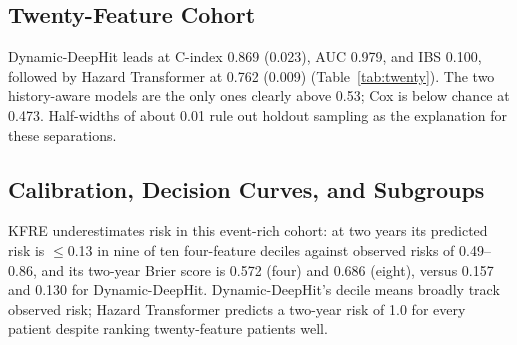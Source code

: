 \subsection{Twenty-Feature Cohort}
\begin{table}[t]
\centering
\scriptsize
\setlength{\tabcolsep}{1.5pt}
\caption{Twenty-feature holdout performance (6{,}521 patients per split). Columns as in Table~\ref{tab:discrimination}; no KFRE equation exists.}
\label{tab:twenty}
\end{table}

Dynamic-DeepHit leads at C-index 0.869 (0.023), AUC 0.979, and IBS 0.100, followed by Hazard Transformer at 0.762 (0.009) (Table~\ref{tab:twenty}). The two history-aware models are the only ones clearly above 0.53; Cox is below chance at 0.473. Half-widths of about 0.01 rule out holdout sampling as the explanation for these separations.

\subsection{Calibration, Decision Curves, and Subgroups}
KFRE underestimates risk in this event-rich cohort: at two years its predicted risk is $\leq$0.13 in nine of ten four-feature deciles against observed risks of 0.49--0.86, and its two-year Brier score is 0.572 (four) and 0.686 (eight), versus 0.157 and 0.130 for Dynamic-DeepHit. Dynamic-DeepHit's decile means broadly track observed risk; Hazard Transformer predicts a two-year risk of 1.0 for every patient despite ranking twenty-feature patients well.


